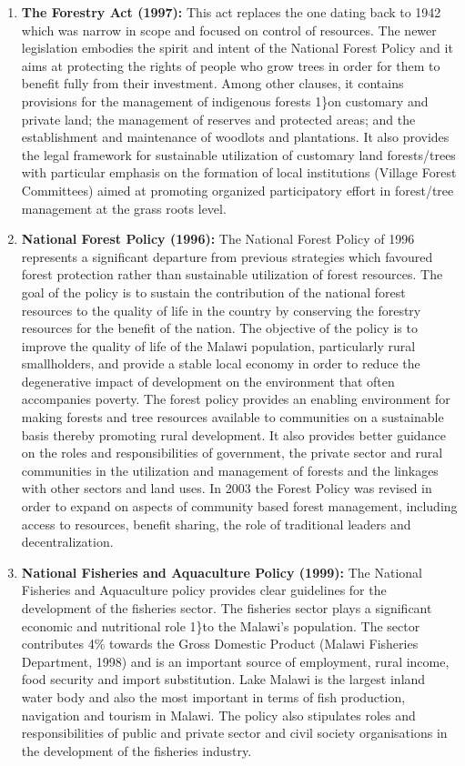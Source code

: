 \documentclass[
]{book}
\begin{document}
\begin{enumerate}
\item
  \textbf{The Forestry Act (1997):} This act replaces the one dating back to 1942 which was narrow in scope and focused on control of resources. The newer legislation embodies the spirit and intent of the National Forest Policy and it aims at protecting the rights of people who grow trees in order for them to benefit fully from their investment. Among other clauses, it contains provisions for the management of indigenous forests 1\}on customary and private land; the management of reserves and protected areas; and the establishment and maintenance of woodlots and plantations. It also provides the legal framework for sustainable utilization of customary land forests/trees with particular emphasis on the formation of local institutions (Village Forest Committees) aimed at promoting organized participatory effort in forest/tree management at the grass roots level.
\item
  \textbf{National Forest Policy (1996):} The National Forest Policy of 1996 represents a significant departure from previous strategies which favoured forest protection rather than sustainable utilization of forest resources. The goal of the policy is to sustain the contribution of the national forest resources to the quality of life in the country by conserving the forestry resources for the benefit of the nation. The objective of the policy is to improve the quality of life of the Malawi population, particularly rural smallholders, and provide a stable local economy in order to reduce the degenerative impact of development on the environment that often accompanies poverty. The forest policy provides an enabling environment for making forests and tree resources available to communities on a sustainable basis thereby promoting rural development. It also provides better guidance on the roles and responsibilities of government, the private sector and rural communities in the utilization and management of forests and the linkages with other sectors and land uses. In 2003 the Forest Policy was revised in order to expand on aspects of community based forest management, including access to resources, benefit sharing, the role of traditional leaders and decentralization.
\item
  \textbf{National Fisheries and Aquaculture Policy (1999):} The National Fisheries and Aquaculture policy provides clear guidelines for the development of the fisheries sector. The fisheries sector plays a significant economic and nutritional role 1\}to the Malawi's population. The sector contributes 4\% towards the Gross Domestic Product (Malawi Fisheries Department, 1998) and is an important source of employment, rural income, food security and import substitution. Lake Malawi is the largest inland water body and also the most important in terms of fish production, navigation and tourism in Malawi. The policy also stipulates roles and responsibilities of public and private sector and civil society organisations in the development of the fisheries industry.

\end{enumerate}
\end{document}
